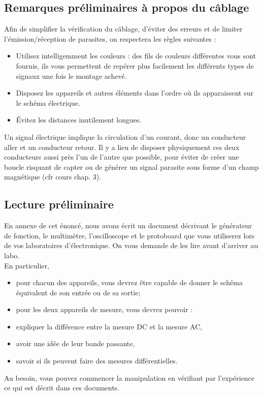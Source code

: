\documentclass{../template/tp}
\begin{document}
\subsection{Remarques préliminaires à propos du câblage}
Afin de simplifier la vérification du câblage, d'éviter des erreurs et de limiter l'émission/réception de parasites, on
respectera les règles suivantes :
\begin{itemize}
\item Utilisez intelligemment les couleurs : des fils de couleurs différentes vous sont fournis, ils vous permettent de
repérer plus facilement les différents types de signaux une fois le montage achevé.
\item Disposez les appareils et autres éléments dans l'ordre où ils apparaissent sur le schéma électrique.
\item Évitez les distances inutilement longues.
\end{itemize}
Un signal électrique implique la circulation d'un courant, donc un conducteur aller et un conducteur retour. Il y a lieu
de disposer physiquement ces deux conducteurs aussi près l'un de l'autre que possible, pour éviter de créer une boucle
risquant de capter ou de générer un signal parasite sous forme d'un champ magnétique (cfr cours chap. 3).

\subsection{Lecture préliminaire}

En annexe de cet énoncé, nous avons écrit un document décrivant le générateur de fonction, le multimètre,
l'oscilloscope et le protoboard que vous utiliserez lors de vos laboratoires d'électronique.
On vous demande de les lire avant d'arriver au labo.\\
En particulier,
\begin{itemize}
\item pour chacun des appareils, vous devrez être capable de donner le schéma équivalent de son entrée ou de sa
sortie;
\item pour les deux appareils de mesure, vous devrez pouvoir :
\item expliquer la différence entre la mesure DC et la mesure AC,
\item avoir une idée de leur bande passante,
\item savoir si ils peuvent faire des mesures différentielles.
\end{itemize}
Au besoin, vous pouvez commencer la manipulation en vérifiant par l'expérience ce qui est décrit dans ces
documents.
\end{document}
